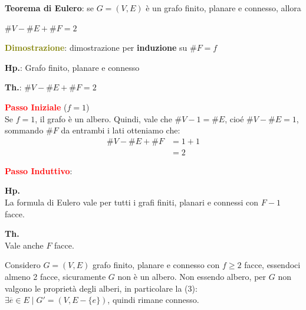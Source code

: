 \newpage
\begin{flushleft}
    \textbf{Teorema di Eulero}: se $G = (V, E)$ è un grafo finito, planare e connesso, allora 
    
    {\centering
        $\# V - \# E + \# F = 2$
    \par}

    \begin{boxA}
        \textcolor{olive}{\textbf{Dimostrazione}}: dimostrazione per \textbf{induzione} su $\# F = f$ 

        {\centering
            \begin{minipage}[t]{0.45\textwidth}
                \centering
                \textbf{Hp.}: Grafo finito, planare e connesso
            \end{minipage}
            \begin{minipage}[t]{0.45\textwidth}
                \centering
                \textbf{Th.}: $\# V - \# E + \# F = 2$
            \end{minipage}
        \par}

        \textcolor{red}{\textbf{Passo Iniziale}} ($f = 1$) \\
        Se $f = 1$, il grafo è un albero. Quindi, vale che $\# V - 1 = \# E$, cioé $\# V - \# E = 1$, sommando $\# F$ da entrambi i lati otteniamo che:
        \begin{align*}
            \# V - \# E + \# F &= 1 + 1 \\
            &= 2
        \end{align*}

        \textcolor{red}{\textbf{Passo Induttivo}}:
        \begin{center}
            \begin{minipage}[t]{0.45\textwidth}
                \centering
                \textbf{Hp.} \\
                La formula di Eulero vale per tutti i grafi finiti, planari e connessi con $F - 1$ facce.
            \end{minipage}
            \begin{minipage}[t]{0.45\textwidth}
                \centering
                \textbf{Th.} \\
                Vale anche $F$ facce.
            \end{minipage}
        \end{center}

        Considero $G = (V, E)$ grafo finito, planare e connesso con $f \geq 2$ facce, essendoci almeno 2 facce, sicuramente $G$ non è un albero. Non essendo albero, per $G$ non valgono le proprietà degli alberi, in particolare la (3): $\exists \overline{e} \in E \; | \; G' = (V, E - \{e\})$, quindi rimane connesso. 


\end{boxA}
\end{flushleft}
